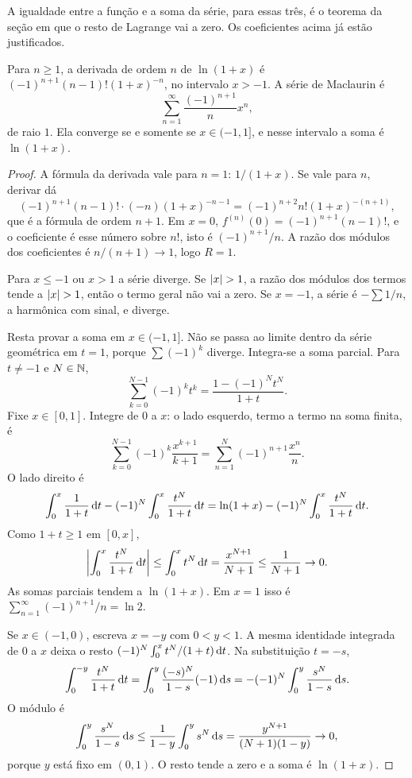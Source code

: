 \documentclass[11pt,a4paper]{article}
\begin{document}
A igualdade entre a função e a soma da série, para essas três, é o teorema da seção em que o resto de Lagrange vai a zero. Os coeficientes acima já estão justificados.

\begin{teorema}[logaritmo]
Para \(n\ge 1\), a derivada de ordem \(n\) de \(\ln(1+x)\) é \((-1)^{n+1}(n-1)!(1+x)^{-n}\), no intervalo \(x>-1\). A série de Maclaurin é
\[
\sum_{n=1}^\infty\frac{(-1)^{n+1}}{n}x^n,
\]
de raio \(1\). Ela converge se e somente se \(x\in(-1,1]\), e nesse intervalo a soma é \(\ln(1+x)\).
\end{teorema}

\begin{proof}
A fórmula da derivada vale para \(n=1\): \(1/(1+x)\). Se vale para \(n\), derivar dá
\[
(-1)^{n+1}(n-1)!\cdot(-n)(1+x)^{-n-1}=(-1)^{n+2}n!(1+x)^{-(n+1)},
\]
que é a fórmula de ordem \(n+1\). Em \(x=0\), \(f^{(n)}(0)=(-1)^{n+1}(n-1)!\), e o coeficiente é esse número sobre \(n!\), isto é \((-1)^{n+1}/n\). A razão dos módulos dos coeficientes é \(n/(n+1)\to 1\), logo \(R=1\).

Para \(x\le -1\) ou \(x>1\) a série diverge. Se \(\left\lvert x \right\rvert>1\), a razão dos módulos dos termos tende a \(\left\lvert x \right\rvert>1\), então o termo geral não vai a zero. Se \(x=-1\), a série é \(-\sum 1/n\), a harmônica com sinal, e diverge.

Resta provar a soma em \(x\in(-1,1]\). Não se passa ao limite dentro da série geométrica em \(t=1\), porque \(\sum (-1)^k\) diverge. Integra-se a soma parcial. Para \(t\neq -1\) e \(N\in\mathbb{N}\),
\[
\sum_{k=0}^{N-1}(-1)^k t^k=\frac{1-(-1)^N t^N}{1+t}.
\]
Fixe \(x\in[0,1]\). Integre de \(0\) a \(x\): o lado esquerdo, termo a termo na soma finita, é
\[
\sum_{k=0}^{N-1}(-1)^k\frac{x^{k+1}}{k+1}=\sum_{n=1}^{N}(-1)^{n+1}\frac{x^n}{n}.
\]
O lado direito é
\[
\int_0^x\frac{1}{1+t}\,\mathrm{d} t-(-1)^N\int_0^x\frac{t^N}{1+t}\,\mathrm{d} t
=\ln(1+x)-(-1)^N\int_0^x\frac{t^N}{1+t}\,\mathrm{d} t.
\]
Como \(1+t\ge 1\) em \([0,x]\),
\[
\left\lvert \int_0^x\frac{t^N}{1+t}\,\mathrm{d} t \right\rvert\le\int_0^x t^N\,\mathrm{d} t=\frac{x^{N+1}}{N+1}\le\frac{1}{N+1}\to 0.
\]
As somas parciais tendem a \(\ln(1+x)\). Em \(x=1\) isso é \(\sum_{n=1}^\infty (-1)^{n+1}/n=\ln 2\).

Se \(x\in(-1,0)\), escreva \(x=-y\) com \(0<y<1\). A mesma identidade integrada de \(0\) a \(x\) deixa o resto \((-1)^N\int_0^x t^N/(1+t)\,\mathrm{d} t\). Na substituição \(t=-s\),
\[
\int_0^{-y}\frac{t^N}{1+t}\,\mathrm{d} t
=\int_0^y\frac{(-s)^N}{1-s}(-1)\,\mathrm{d} s
=-(-1)^N\int_0^y\frac{s^N}{1-s}\,\mathrm{d} s.
\]
O módulo é
\[
\int_0^y\frac{s^N}{1-s}\,\mathrm{d} s
\le\frac{1}{1-y}\int_0^y s^N\,\mathrm{d} s
=\frac{y^{N+1}}{(N+1)(1-y)}\to 0,
\]
porque \(y\) está fixo em \((0,1)\). O resto tende a zero e a soma é \(\ln(1+x)\).
\end{proof}
\end{document}
